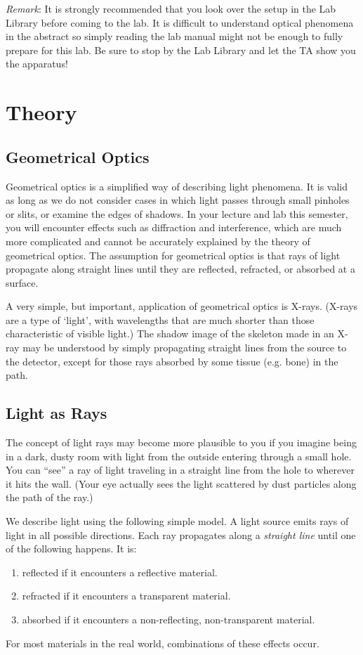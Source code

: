 \emph{Remark}: It is strongly recommended that you look over the setup in the Lab Library before coming to the lab. It is difficult to understand optical phenomena in the abstract so simply reading the lab manual might not be enough to fully prepare for this lab.  Be sure to stop by the Lab Library and let the TA show you the apparatus!

\section{Theory}

\subsection{Geometrical Optics}

Geometrical optics is a simplified way of describing light phenomena. It is valid as long as we do not consider cases in which light passes through small pinholes or slits, or examine the edges of shadows. In your lecture and lab this semester, you will encounter effects such as diffraction and interference, which are much more complicated and cannot be accurately explained by the theory of geometrical optics. The assumption for geometrical optics is that rays of light propagate along straight lines until they are reflected, refracted, or absorbed at a surface. \myskip

A very simple, but important, application of geometrical optics is X-rays. (X-rays are a type of `light', with wavelengths that are much shorter than those characteristic of visible light.)  The shadow image of the skeleton made in an X-ray may be understood by simply propagating straight lines from the source to the detector, except for those rays absorbed by some tissue (e.g. bone) in the path.

\subsection{Light as Rays}

The concept of light rays may become more plausible to you if you imagine being in a dark, dusty room with light from the outside entering through a small hole. You can ``see'' a ray of light traveling in a straight line from the hole to wherever it hits the wall.  (Your eye actually sees the light scattered by dust particles along the path of the ray.)\myskip

We describe light using the following simple model. A light source emits rays of light in all possible directions. Each ray propagates along a \emph{straight line} until one of the following happens. It is:
\begin{enumerate}
    \item	reflected if it encounters a reflective material.
    \item	refracted if it encounters a transparent material.
    \item	absorbed if it encounters a non-reflecting, non-transparent material.
\end{enumerate}
For most materials in the real world, combinations of these effects occur.\myskip


